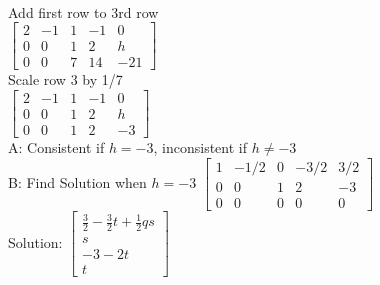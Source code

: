 \documentclass{article}
\begin{document}
\\[0.05in]Add first row to 3rd row\\[0.05in]
$\left[\begin{array}{cccc|c}
2 & -1 & 1 & -1 & 0 \\
0 & 0 & 1 & 2 & h \\
0 & 0 & 7 & 14 & -21
\end{array}\right]$
\\[0.05in]Scale row 3 by 1/7\\[0.05in]
$\left[\begin{array}{cccc|c}
2 & -1 & 1 & -1 & 0 \\
0 & 0 & 1 & 2 & h \\
0 & 0 & 1 & 2 & -3
\end{array}\right]$\\[0.05in]
A: Consistent if $h=-3$, inconsistent if $h\neq -3$\\
B: Find Solution when $h=-3$
$\left[\begin{array}{cccc|c}
1 & -1/2 & 0 & -3/2 & 3/2 \\
0 & 0 & 1 & 2 & -3 \\
0 & 0 & 0 & 0 & 0
\end{array}\right]$
\\[0.1in]Solution:
$\left[\begin{array}{c}
\frac{3}{2}-\frac{3}{2}t+\frac{1}{2}qs \\
s \\
-3-2t \\
t
\end{array}\right]$
\end{document}
